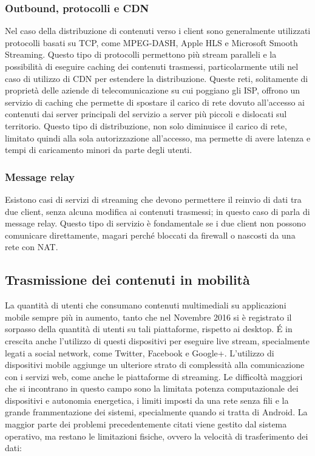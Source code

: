 			\subsubsection{Outbound, protocolli e CDN}
			Nel caso della distribuzione di contenuti verso i client sono generalmente utilizzati protocolli basati su TCP, come MPEG-DASH, Apple HLS e Microsoft Smooth Streaming. Questo tipo di protocolli permettono più stream paralleli e la possibilità di eseguire caching dei contenuti trasmessi, particolarmente utili nel caso di utilizzo di CDN per estendere la distribuzione. Queste reti, solitamente di proprietà delle aziende di telecomunicazione su cui poggiano gli ISP, offrono un servizio di caching che permette di spostare il carico di rete dovuto all'accesso ai contenuti dai server principali del servizio a server più piccoli e dislocati sul territorio. Questo tipo di distribuzione, non solo diminuisce il carico di rete, limitato quindi alla sola autorizzazione all'accesso, ma permette di avere latenza e tempi di caricamento minori da parte degli utenti.

			\subsubsection{Message relay}
			Esistono casi di servizi di streaming che devono permettere il reinvio di dati tra due client, senza alcuna modifica ai contenuti trasmessi; in questo caso di parla di message relay. Questo tipo di servizio è fondamentale se i due client non possono comunicare direttamente, magari perché bloccati da firewall o nascosti da una rete con NAT.\@

	 \subsection{Trasmissione dei contenuti in mobilità}
			La quantità di utenti che consumano contenuti multimediali su applicazioni mobile sempre più in aumento, tanto che nel Novembre 2016 si è registrato il sorpasso della quantità di utenti su tali piattaforme, rispetto ai desktop. É in crescita anche l'utilizzo di questi dispositivi per eseguire live stream, specialmente legati a social network, come Twitter, Facebook e Google+.
			L'utilizzo di dispositivi mobile aggiunge un ulteriore strato di complessità alla comunicazione con i servizi web, come anche le piattaforme di streaming.
			Le difficoltà maggiori che si incontrano in questo campo sono la limitata potenza computazionale dei dispositivi e autonomia energetica, i limiti imposti da una rete senza fili e la grande frammentazione dei sistemi, specialmente quando si tratta di Android.
			La maggior parte dei problemi precedentemente citati viene gestito dal sistema operativo, ma restano le limitazioni fisiche, ovvero la velocità di trasferimento dei dati:
